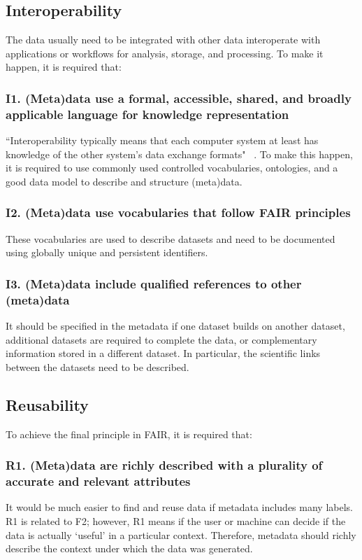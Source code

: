 \subsection*{Interoperability}
The data usually need to be integrated with other data interoperate with applications or workflows for analysis, storage, and processing. To make it happen, it is required that:


\subsubsection*{I1. (Meta)data use a formal, accessible, shared, and broadly applicable language for knowledge representation}

``Interoperability typically means that each computer system at least has knowledge of the other system's data exchange formats" ~\cite{FAIR_Principles}. To make this happen, it is required to use commonly used controlled vocabularies, ontologies, and a good data model to describe and structure (meta)data.
 
\subsubsection*{I2. (Meta)data use vocabularies that follow FAIR principles}
These vocabularies are used to describe datasets and need to be documented using globally unique and persistent identifiers.

\subsubsection*{I3. (Meta)data include qualified references to other (meta)data}
It should be specified in the metadata if one dataset builds on another dataset, additional datasets are required to complete the data, or complementary information stored in a different dataset. In particular, the scientific links between the datasets need to be described.

\subsection*{Reusability}
To achieve the final principle in FAIR, it is required that:

\subsubsection*{R1. (Meta)data are richly described with a plurality of accurate and relevant attributes}
It would be much easier to find and reuse data if metadata includes many labels. R1 is related to F2; however, R1 means if the user or machine can decide if the data is actually `useful' in a particular context. Therefore, metadata should richly describe the context under which the data was generated. 

